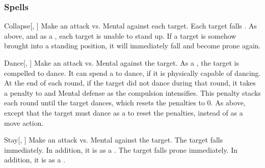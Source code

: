 \subsubsection{Spells}


\lowercase{\hypertarget{spell:Collapse}{}}\label{spell:Collapse}
\begin{freeability}[\nth{1}]{\hypertarget{spell:Collapse}{Collapse}}[, ]
Make an attack vs. Mental against each target.
\hit Each target falls .
\crit As above, and as a , each target is unable to stand up.
If a target is somehow brought into a standing position, it will immediately fall and become prone again.
\end{freeability}
\vspace{0.25em}



\lowercase{\hypertarget{spell:Dance}{}}\label{spell:Dance}
\begin{freeability}[\nth{1}]{\hypertarget{spell:Dance}{Dance}}[, ]
Make an attack vs. Mental against the target.
\hit As a , the target is compelled to dance.
It can spend a  to dance, if it is physically capable of dancing.
At the end of each round, if the target did not dance during that round, it takes a  penalty to  and Mental defense as the compulsion intensifies.
This penalty stacks each round until the target dances, which resets the penalties to 0.
\crit As above, except that the target must dance as a  to reset the penalties, instead of as a move action.
\end{freeability}
\vspace{0.25em}



\lowercase{\hypertarget{spell:Stay}{}}\label{spell:Stay}
\begin{freeability}[\nth{1}]{\hypertarget{spell:Stay}{Stay}}[, ]
Make an attack vs. Mental against the target.
\hit The target falls  immediately. In addition, it is  as a .
\crit The target falls prone immediately. In addition, it is  as a .
\end{freeability}
\vspace{0.25em}



